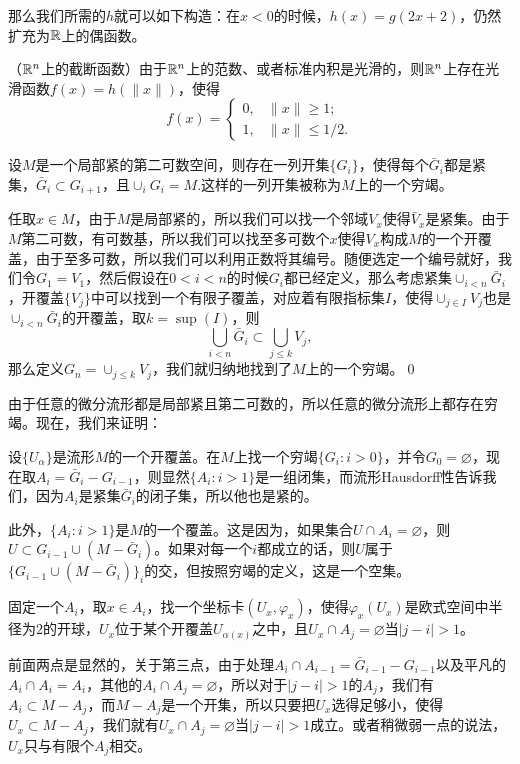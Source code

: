 那么我们所需的$h$就可以如下构造：在$x<0$的时候，$h(x)=g(2x+2)$，仍然扩充为$\mathbb{R}$上的偶函数。

\para （$\mathbb{R}^n$上的截断函数）由于$\mathbb{R}^n$上的范数、或者标准内积是光滑的，则$\mathbb{R}^n$上存在光滑函数$f(x)=h(\|x\|)$，使得
\[
	f(x)=
		\begin{cases}
		0,&\|x\|\geq 1;\\
		1,&\|x\|\leq 1/2.
		\end{cases}
\]

\para 设$M$是一个局部紧的第二可数空间，则存在一列开集$\{G_i\}$，使得每个$\bar{G}_i$都是紧集，$\bar{G}_i\subset G_{i+1}$，且$\cup_iG_i=M$.这样的一列开集被称为$M$上的一个穷竭。

\proof 任取$x\in M$，由于$M$是局部紧的，所以我们可以找一个邻域$V_x$使得$\bar{V}_x$是紧集。由于$M$第二可数，有可数基，所以我们可以找至多可数个$x$使得$V_x$构成$M$的一个开覆盖，由于至多可数，所以我们可以利用正数将其编号。随便选定一个编号就好，我们令$G_1=V_1$，然后假设在$0<i<n$的时候$G_i$都已经定义，那么考虑紧集$\cup_{i<n}\bar{G}_i$，开覆盖$\{V_j\}$中可以找到一个有限子覆盖，对应着有限指标集$I$，使得$\cup_{j\in I}V_j$也是$\cup_{i<n}\bar{G}_i$的开覆盖，取$k=\sup(I)$，则
\[
	\bigcup_{i<n}\bar{G}_i\subset \bigcup_{j\leq k}V_j,
\]
那么定义$G_n=\cup_{j\leq k}V_j$，我们就归纳地找到了$M$上的一个穷竭。\qed

由于任意的微分流形都是局部紧且第二可数的，所以任意的微分流形上都存在穷竭。现在，我们来证明：

\proof 设$\{U_{\alpha}\}$是流形$M$的一个开覆盖。在$M$上找一个穷竭$\{G_i:i>0\}$，并令$G_0=\varnothing$，现在取$A_i=\bar{G}_i-G_{i-1}$，则显然$\{A_i:i>1\}$是一组闭集，而流形Hausdorff性告诉我们，因为$A_i$是紧集$\bar{G}_i$的闭子集，所以他也是紧的。

此外，$\{A_i:i>1\}$是$M$的一个覆盖。这是因为，如果集合$U\cap A_i=\varnothing$，则$U\subset G_{i-1}\cup (M-\bar{G}_{i})$。如果对每一个$i$都成立的话，则$U$属于$\{G_{i-1}\cup (M-\bar{G}_{i})\}_i$的交，但按照穷竭的定义，这是一个空集。

固定一个$A_i$，取$x\in A_i$，找一个坐标卡$(U_x,\varphi_x)$，使得$\varphi_x(U_x)$是欧式空间中半径为$2$的开球，$U_x$位于某个开覆盖$U_{\alpha(x)}$之中，且$U_x\cap A_j=\varnothing$当$|j-i|>1$。

前面两点是显然的，关于第三点，由于处理$A_i\cap A_{i-1}= \bar{G}_{i-1}-G_{i-1}$以及平凡的$A_i\cap A_i=A_i$，其他的$A_i\cap A_j=\varnothing$，所以对于$|j-i|>1$的$A_j$，我们有$A_i\subset M-A_j$，而$M-A_j$是一个开集，所以只要把$U_x$选得足够小，使得$U_x\subset M-A_j$，我们就有$U_x\cap A_j=\varnothing$当$|j-i|>1$成立。或者稍微弱一点的说法，$U_x$只与有限个$A_j$相交。

